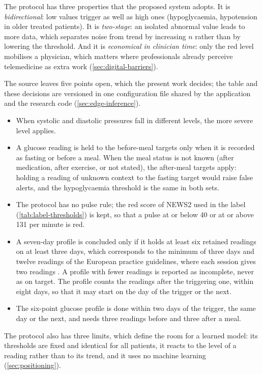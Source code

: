 The protocol has three properties that the proposed system adopts. It is \emph{bidirectional}: low values trigger as well as high ones (hypoglycaemia, hypotension in older treated patients). It is \emph{two-stage}: an isolated abnormal value leads to more data, which separates noise from trend by increasing $n$ rather than by lowering the threshold. And it is \emph{economical in clinician time}: only the red level mobilises a physician, which matters where professionals already perceive telemedicine as extra work (\cref{sec:digital-barriers}).

The source leaves five points open, which the present work decides; the table and these decisions are versioned in one configuration file shared by the application and the research code (\cref{sec:edge-inference}).
\begin{itemize}[nosep]
  \item When systolic and diastolic pressures fall in different levels, the more severe level applies.
  \item A glucose reading is held to the before-meal targets only when it is recorded as fasting or before a meal. When the meal status is not known (after medication, after exercise, or not stated), the after-meal targets apply: holding a reading of unknown context to the fasting target would raise false alerts, and the hypoglycaemia threshold is the same in both sets.
  \item The protocol has no pulse rule; the red score of NEWS2 used in the label (\cref{tab:label-thresholds}) is kept, so that a pulse at or below 40 or at or above 131 per minute is red.
  \item A seven-day profile is concluded only if it holds at least six retained readings on at least three days, which corresponds to the minimum of three days and twelve readings of the European practice guidelines, where each session gives two readings \parencite{stergiou2021}. A profile with fewer readings is reported as incomplete, never as on target. The profile counts the readings after the triggering one, within eight days, so that it may start on the day of the trigger or the next.
  \item The six-point glucose profile is done within two days of the trigger, the same day or the next, and needs three readings before and three after a meal.
\end{itemize}

The protocol also has three limits, which define the room for a learned model: its thresholds are fixed and identical for all patients, it reacts to the level of a reading rather than to its trend, and it uses no machine learning (\cref{sec:positioning}).

